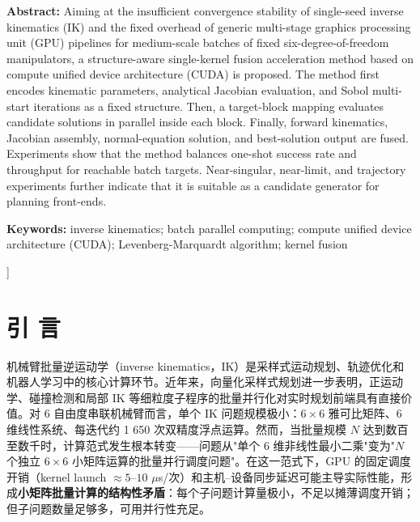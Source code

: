 \documentclass[twocolumn,a4paper,10pt]{ctexart}
\begin{document}
{\begin{minipage}{0.91\textwidth}
{\bfseries Abstract:} Aiming at the insufficient convergence stability of single-seed inverse kinematics (IK) and the fixed overhead of generic multi-stage graphics processing unit (GPU) pipelines for medium-scale batches of fixed six-degree-of-freedom manipulators, a structure-aware single-kernel fusion acceleration method based on compute unified device architecture (CUDA) is proposed. The method first encodes kinematic parameters, analytical Jacobian evaluation, and Sobol multi-start iterations as a fixed structure. Then, a target-block mapping evaluates candidate solutions in parallel inside each block. Finally, forward kinematics, Jacobian assembly, normal-equation solution, and best-solution output are fused. Experiments show that the method balances one-shot success rate and throughput for reachable batch targets. Near-singular, near-limit, and trajectory experiments further indicate that it is suitable as a candidate generator for planning front-ends.\par\vspace{2mm}
{\bfseries Keywords:} inverse kinematics; batch parallel computing; compute unified device architecture (CUDA); Levenberg-Marquardt algorithm; kernel fusion\par
\end{minipage}\par
}]

\setcounter{section}{-1}
\section{引 言}

机械臂批量逆运动学（inverse kinematics，IK）是采样式运动规划、轨迹优化和机器人学习中的核心计算环节\cite{siciliano2010robotics,lynch2017modern,lavalle2006planning,sucan2012ompl}。近年来，向量化采样式规划进一步表明，正运动学、碰撞检测和局部 IK 等细粒度子程序的批量并行化对实时规划前端具有直接价值\cite{thomason2024vamp}。对 6 自由度串联机械臂而言，单个 IK 问题规模极小：$6\times6$ 雅可比矩阵、6 维线性系统、每迭代约 1 650 次双精度浮点运算。然而，当批量规模 $N$ 达到数百至数千时，计算范式发生根本转变——问题从"单个 6 维非线性最小二乘"变为"$N$ 个独立 $6\times6$ 小矩阵运算的批量并行调度问题"。在这一范式下，GPU 的固定调度开销（kernel launch $\approx5$--$10$ $\mu$s/次）和主机--设备同步延迟可能主导实际性能\cite{cuda,nickolls2008cuda}，形成\textbf{小矩阵批量计算的结构性矛盾}：每个子问题计算量极小，不足以摊薄调度开销；但子问题数量足够多，可用并行性充足。
\end{document}
